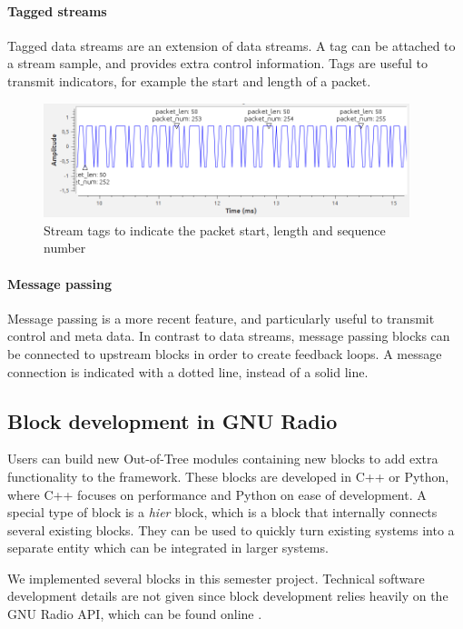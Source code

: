 \paragraph*{Tagged streams}
Tagged data streams are an extension of data streams. A tag can be attached to a stream sample, and provides extra control information. Tags are useful to transmit indicators, for example the start and length of a packet.
\begin{figure}[H]
    \centering
    \includegraphics[width=0.95\textwidth]{img_other/tagged_streams.png}
    \caption{Stream tags to indicate the packet start, length and sequence number}
    \label{fig:datatypes}
\end{figure}



\paragraph*{Message passing}
Message passing is a more recent feature, and particularly useful to transmit control and meta data. In contrast to data streams, message passing blocks can be connected to upstream blocks in order to create feedback loops. A message connection is indicated with a dotted line, instead of a solid line.

\subsection{Block development in GNU Radio}
Users can build new Out-of-Tree modules containing new blocks to add extra functionality to the framework.  These blocks are developed in C++ or Python, where C++ focuses on performance and Python on ease of development. A special type of block is a \textit{hier} block, which is a block that internally connects several existing blocks. They can be used to quickly turn existing systems into a separate entity which can be integrated in larger systems.\medskip

We implemented several blocks in this semester project. Technical software development details are not given since block development relies heavily on the GNU Radio API, which can be found online \cite{gr_doxygen}.


